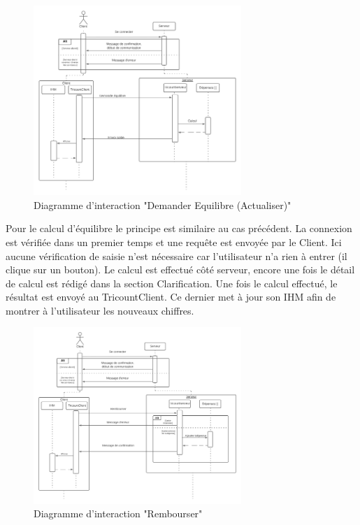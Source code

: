 \documentclass[12,french]{report}
\begin{document}
\begin{figure}[H]
	\center
	\includegraphics[width=0.7\textwidth]{./Images_pooa/Interaction_DemanderEquilibre}
	\caption{Diagramme d'interaction "Demander Equilibre (Actualiser)"}
\end{figure}\vspace{0.2cm}

Pour le calcul d'équilibre le principe est similaire au cas précédent. La connexion est vérifiée dans un premier temps et une requête est envoyée par le Client. Ici aucune vérification de saisie n'est nécessaire car l'utilisateur n'a rien à entrer (il clique sur un bouton). Le calcul est effectué côté serveur, encore une fois le détail de calcul est rédigé dans la section Clarification. Une fois le calcul effectué, le résultat est envoyé au TricountClient. Ce dernier met à jour son IHM afin de montrer à l'utilisateur les nouveaux chiffres. \\

\begin{figure}[H]
	\center
	\includegraphics[width=0.7\textwidth]{./Images_pooa/Interaction_Rembourser}
	\caption{Diagramme d'interaction "Rembourser"}
\end{figure}\vspace{0.2cm}
\end{document}
